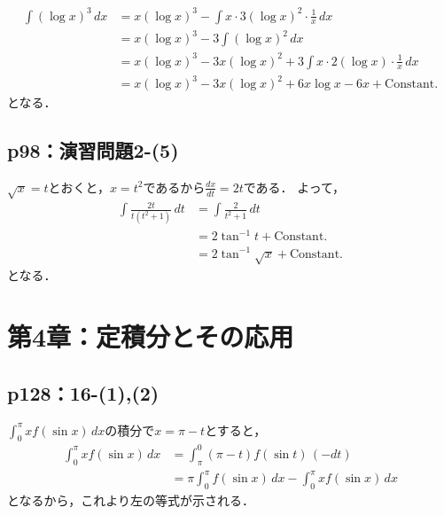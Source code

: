 \documentclass[uplatex,dvipdfmx,a4paper,10pt,fleqn]{jsarticle}
\newenvironment{tleftbar}{\begin{tbleftline}\setlength{\parindent}{1zw}}{\end{tbleftline}}
\begin{document}
\begin{tleftbar}
\begin{align*} 
    \int (\log x)^3 \, dx & = x (\log x)^3 - \int x \cdot 3 (\log x)^2 \cdot \frac{1}{x} \, dx \\
    & = x(\log x)^3- 3  \int (\log x)^2 \, dx \\
    & = x(\log x)^3 - 3x (\log x)^2 + 3\int x \cdot 2 (\log x )\cdot \frac{1}{x} \, dx \\
    & = x (\log x)^3 - 3x (\log x)^2 + 6 x\log x - 6x+\mathrm{Constant.}
\end{align*} 
となる．
\end{tleftbar}


\subsection*{p98：演習問題2-(5)}

\begin{tleftbar}
    $\sqrt{x}=t$とおくと，$ x =t^2$であるから$ \frac{dx}{dt}=2t$である．
    よって，
    \begin{align*}
        \int \frac{2t}{t (t^2+1)} \, dt & = \int \frac{2}{t^2+1}\, dt \\
        & = 2 \tan^{-1} t + \mathrm{Constant.}\\
        & = 2 \tan^{-1} \sqrt{x} + \mathrm{Constant.}
    \end{align*} 
    となる．
\end{tleftbar}



\section*{第4章：定積分とその応用}


\subsection*{p128：16-(1),(2)}

$\int_{0}^{\pi} x f(\sin x)\, dx $の積分で$x= \pi -t $とすると，
\begin{align*} 
    \int_{0}^{\pi} x f( \sin x) \, dx & = \int_{\pi}^{0} (\pi - t) f(\sin t )\, ( -dt) \\
    & = \pi \int_{0}^{\pi} f(\sin x) \, dx - \int_{0}^{\pi} x f (\sin x)\, dx 
\end{align*} 
となるから，これより左の等式が示される．
\end{document}
